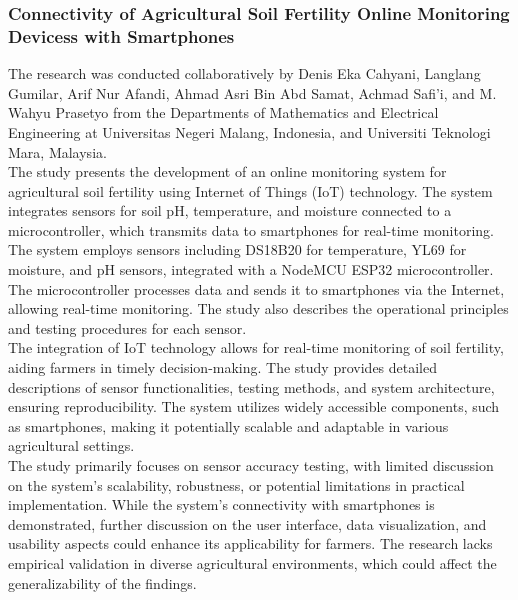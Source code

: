 \documentclass[12pt, a4paper]{article}
\begin{document}
\subsubsection{Connectivity of Agricultural Soil Fertility Online Monitoring Devicess with Smartphones}
The research was conducted collaboratively by Denis Eka Cahyani, Langlang Gumilar, Arif Nur Afandi, Ahmad Asri Bin Abd Samat, Achmad Safi'i, and M. Wahyu Prasetyo \cite{cahyani2023connectivity} from the Departments of Mathematics and Electrical Engineering at Universitas Negeri Malang, Indonesia, and Universiti Teknologi Mara, Malaysia.\\
The study presents the development of an online monitoring system for agricultural soil fertility using Internet of Things (IoT) technology. The system integrates sensors for soil pH, temperature, and moisture connected to a microcontroller, which transmits data to smartphones for real-time monitoring.\\
The system employs sensors including DS18B20 for temperature, YL69 for moisture, and pH sensors, integrated with a NodeMCU ESP32 microcontroller. The microcontroller processes data and sends it to smartphones via the Internet, allowing real-time monitoring. The study also describes the operational principles and testing procedures for each sensor.\\
The integration of IoT technology allows for real-time monitoring of soil fertility, aiding farmers in timely decision-making. The study provides detailed descriptions of sensor functionalities, testing methods, and system architecture, ensuring reproducibility. The system utilizes widely accessible components, such as smartphones, making it potentially scalable and adaptable in various agricultural settings.\\
The study primarily focuses on sensor accuracy testing, with limited discussion on the system's scalability, robustness, or potential limitations in practical implementation. While the system's connectivity with smartphones is demonstrated, further discussion on the user interface, data visualization, and usability aspects could enhance its applicability for farmers. The research lacks empirical validation in diverse agricultural environments, which could affect the generalizability of the findings.
\end{document}
